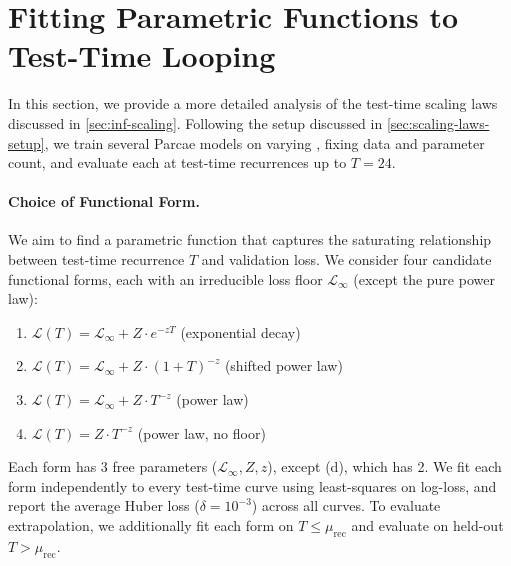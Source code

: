 \section{Fitting Parametric Functions to Test-Time Looping}
\label{sec:test-par}

In this section, we provide a more detailed analysis of the test-time scaling laws discussed in \cref{sec:inf-scaling}. Following the setup discussed in \cref{sec:scaling-laws-setup}, we train several Parcae models on varying \meanrecurrence, fixing data and parameter count, and evaluate each at test-time recurrences up to $T=24$.

\paragraph{Choice of Functional Form.}
We aim to find a parametric function that captures the saturating relationship between test-time recurrence $T$ and validation loss. We consider four candidate functional forms, each with an irreducible loss floor $\mathcal{L}_\infty$ (except the pure power law):
\begin{enumerate}[label=(\alph*), nosep]
  \item $\mathcal{L}(T) = \mathcal{L}_\infty + Z \cdot e^{-zT}$ \hfill (exponential decay)
  \item $\mathcal{L}(T) = \mathcal{L}_\infty + Z \cdot (1+T)^{-z}$ \hfill (shifted power law)
  \item $\mathcal{L}(T) = \mathcal{L}_\infty + Z \cdot T^{-z}$ \hfill (power law)
  \item $\mathcal{L}(T) = Z \cdot T^{-z}$ \hfill (power law, no floor)
\end{enumerate}
Each form has 3 free parameters ($\mathcal{L}_\infty, Z, z$), except (d), which has 2. We fit each form independently to every test-time curve using least-squares on log-loss, and report the average Huber loss ($\delta = 10^{-3}$) across all curves. To evaluate extrapolation, we additionally fit each form on $T \leq \mu_{\text{rec}}$ and evaluate on held-out $T > \mu_{\text{rec}}$.


